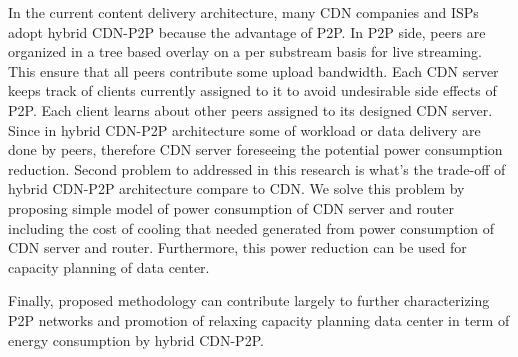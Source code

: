 In the current content delivery architecture, many CDN companies and ISPs adopt hybrid CDN-P2P because the advantage of P2P. 
In P2P side, peers are organized in a tree based overlay on a per substream basis for live streaming.   
This ensure that all peers contribute some upload bandwidth. 
Each CDN server keeps track of clients currently assigned to it to avoid undesirable side effects of P2P.
Each client learns about other peers assigned to its designed CDN server.
Since in hybrid CDN-P2P architecture some of workload or data delivery are done by peers, therefore CDN server foreseeing the potential power consumption reduction. 
Second problem to addressed in this research is what's the trade-off of hybrid CDN-P2P architecture compare to CDN.
We solve this problem by proposing simple model of power consumption of CDN server and router including the cost of cooling that needed generated from power consumption of CDN server and router. 
Furthermore, this power reduction can be used for capacity planning of data center. 

Finally, proposed methodology can contribute largely to further characterizing P2P networks and promotion of relaxing capacity planning data center in term of energy consumption by hybrid CDN-P2P. 

